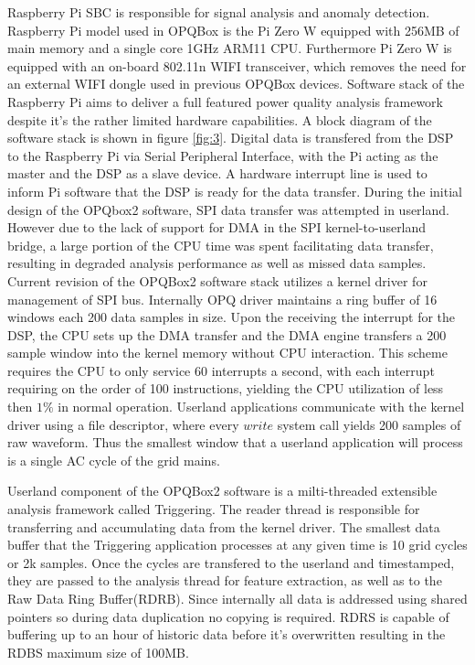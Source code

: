 Raspberry Pi SBC is responsible for signal analysis and anomaly detection. Raspberry Pi model used in OPQBox is the Pi Zero W equipped with 256MB of main memory and a single core 1GHz ARM11 CPU. Furthermore Pi Zero W is equipped with an on-board 802.11n WIFI transceiver, which removes the need for an external WIFI dongle used in previous OPQBox devices. Software stack of the Raspberry Pi aims to deliver a full featured power quality analysis framework despite it's the rather limited hardware capabilities. A block diagram of the software stack is shown in figure \ref{fig:3}. Digital data is transfered from the DSP to the Raspberry Pi via Serial Peripheral Interface, with the Pi acting as the master and the DSP as a slave device. A hardware interrupt line is used to inform Pi software that the DSP is ready for the data transfer. During the initial design of the OPQbox2 software, SPI data transfer was attempted in userland. However due to the lack of support for DMA in the SPI kernel-to-userland bridge, a large portion of the CPU time was spent facilitating data transfer, resulting in degraded analysis performance as well as missed data samples. Current revision of the OPQBox2 software stack utilizes a kernel driver for management of SPI bus. Internally OPQ driver maintains a ring buffer of 16 windows each 200 data samples in size. Upon the receiving the interrupt for the DSP, the CPU sets up the DMA transfer and the DMA engine transfers a 200 sample window into the kernel memory without CPU interaction. This scheme requires the CPU to only service 60 interrupts a second, with each interrupt requiring on the order of 100 instructions, yielding the CPU utilization of less then $1\%$ in normal operation. Userland applications communicate with the kernel driver using a file descriptor, where every $write$ system call yields 200 samples of raw waveform. Thus the smallest window that a userland application will process is a single AC cycle of the grid mains.

Userland component of the OPQBox2 software is a milti-threaded extensible analysis framework called Triggering. The reader thread is responsible for transferring and accumulating data from the kernel driver. The smallest data buffer that the Triggering application processes at any given time is 10 grid cycles or 2k samples. Once the cycles are transfered to the userland and timestamped, they are passed to the analysis thread for feature extraction, as well as to the Raw Data Ring Buffer(RDRB). Since internally all data is addressed using shared pointers so during data duplication no copying is required. RDRS is capable of buffering up to an hour of historic data before it's overwritten resulting in the RDBS maximum size of 100MB. 


